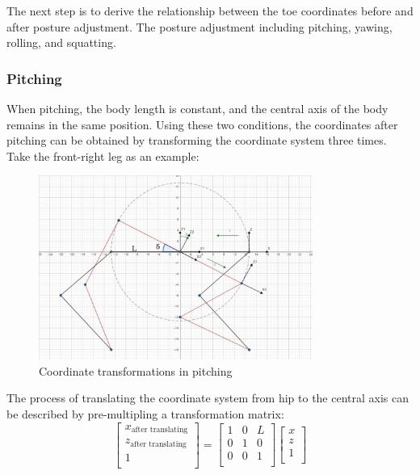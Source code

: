 The next step is to derive the relationship between the toe coordinates before and after posture adjustment. The posture adjustment including pitching, yawing, rolling, and squatting.

\subsubsection{Pitching}

When pitching, the body length is constant, and the central axis of the body remains in the same position. Using these two conditions, the coordinates after pitching can be obtained by transforming the coordinate system three times. Take the front-right leg as an example:

\begin{figure}[htbp]
   \centering
   \includegraphics[width=0.8\textwidth]{figures/coordinate_transformations_in_pitching.jpg}
   \caption{Coordinate transformations in pitching}
   \label{fig:coordinate_transformations_in_pitching}
\end{figure}

The process of translating the coordinate system from hip to the central axis can be described by pre-multipling a transformation matrix:
\begin{equation}
   \begin{bmatrix}
   x_\text{after translating} \\
   z_\text{after translating} \\
   1                          \\
   \end{bmatrix}
   =
   \begin{bmatrix}
   1 & 0 & L \\
   0 & 1 & 0 \\
   0 & 0 & 1 \\
   \end{bmatrix}
   \begin{bmatrix}
   x \\
   z \\
   1 \\
   \end{bmatrix}
\end{equation}

